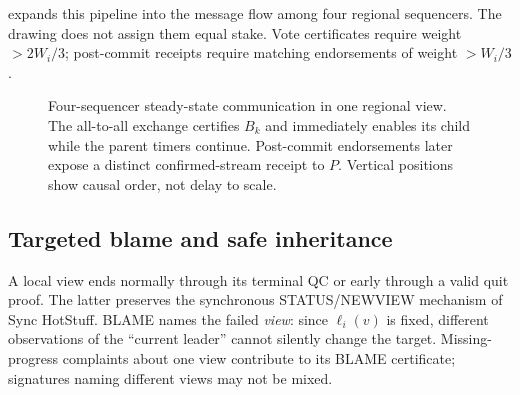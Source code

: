 \documentclass[11pt,a4paper,onecolumn]{article}
\begin{document}
 expands this pipeline into the message flow
among four regional sequencers. The drawing does not assign them equal stake.
Vote certificates require weight $>2W_i/3$; post-commit receipts require
matching endorsements of weight $>W_i/3$.

\begin{figure}[H]\centering

\caption{Four-sequencer steady-state communication in one regional view.
The all-to-all exchange certifies $B_k$ and immediately enables its child while
the parent timers continue. Post-commit endorsements later expose a distinct
confirmed-stream receipt to $P$. Vertical positions show causal order, not
delay to scale.}
\label{fig:pipeline-communication}
\end{figure}

\subsection{Targeted blame and safe inheritance}
A local view ends normally through its terminal QC or early through a valid
quit proof. The latter preserves the synchronous STATUS/NEWVIEW mechanism
of Sync HotStuff. BLAME names the failed \emph{view}: since $\ell_i(v)$ is
fixed, different observations of the ``current leader'' cannot silently
change the target. Missing-progress complaints about one view contribute to its BLAME
certificate; signatures naming different views may not be mixed.
\end{document}
